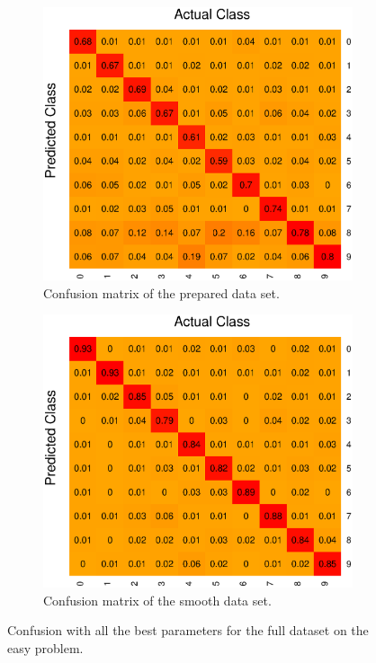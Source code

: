 \begin{figure}[H]
\centering
\begin{subfigure}{0.49\textwidth}
\includegraphics[width=\textwidth]{graphics/tree_confusion_mix}
\caption{Confusion matrix of the prepared data set.}
\label{fig:tree_confus_mixed}
\end{subfigure}
\begin{subfigure}{0.49\textwidth}
\includegraphics[width=\textwidth]{graphics/tree_confusion_mix2}
\caption{Confusion matrix of the smooth data set.}
\label{fig:tree_confus_mixed_smooth}
\end{subfigure}
\caption{Confusion with all the best parameters for the full dataset on the easy problem.}
\end{figure}

